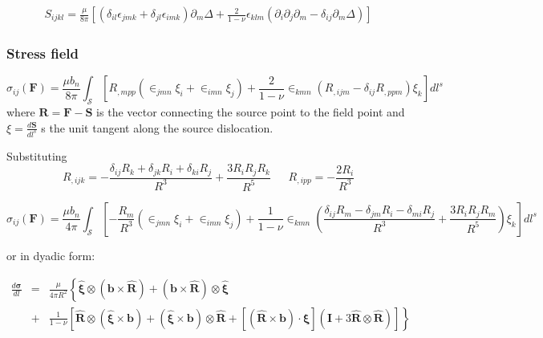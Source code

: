 \documentclass[10pt]{report}
\begin{document}
{\begin{align}
S_{ijkl}=\frac{\mu}{8\pi}\left[\left(\delta_{il}\epsilon_{jmk}+\delta_{jl}\epsilon_{imk}\right)\partial_m\Delta+\frac{2}{1-\nu}\epsilon_{klm}\left(\partial_{i}\partial_j\partial_m-\delta_{ij}\partial_m\Delta\right)\right]
\end{align}



\subsubsection{Stress field}
\begin{equation}
\sigma_{ij}(\bm F)=\frac{\mu b_n}{8\pi}\int_\mathcal{S} \left[R_{,mpp}\left(\in_{jmn}\xi_i+\in_{imn}\xi_j\right)+\frac{2}{1-\nu}\in_{kmn}\left(R_{,ijm}-\delta_{ij}R_{,ppm}\right)\xi_k\right]dl^s
\end{equation}
where $\bm R=\bm F-\bm S$ is the vector connecting the source point to the field point and $\xi=\frac{d\bm S}{dl^s}$ s the unit tangent along the source dislocation. 

Substituting 
\begin{equation}
R_{,ijk}=-\frac{\delta_{ij}R_k+\delta_{jk}R_i+\delta_{ki}R_j}{R^3}+\frac{3R_iR_jR_k}{R^5} \ \ \ \ \ \ \    R_{,ipp}=-\frac{2R_i}{R^3}
\end{equation}

\begin{equation}
\sigma_{ij}(\bm F)=\frac{\mu b_n}{4\pi}\int_\mathcal{S} \left[-\frac{R_m}{R^3}\left(\in_{jmn}\xi_i+\in_{imn}\xi_j\right)+\frac{1}{1-\nu}\in_{kmn}\left(\frac{\delta_{ij}R_m-\delta_{jm}R_i-\delta_{mi}R_j}{R^3}+\frac{3R_iR_jR_m}{R^5}\right)\xi_k\right]dl^s
\end{equation}




or in dyadic form:

\begin{eqnarray}
\frac{d\bm \sigma}{dl}&=&\frac{\mu}{4\pi R^2}\left\{\hat{\bm\xi}\otimes(\bm b\times \hat{\bm R})+(\bm b\times \hat{\bm R})\otimes\hat{\bm\xi}\right.\nonumber\\
&+&\left.\frac{1}{1-\nu}\left[\hat{\bm R}\otimes(\hat{\bm\xi}\times\bm b)+(\hat{\bm\xi}\times\bm b)\otimes\hat{\bm R}
+ \left[(\hat{\bm R}\times\bm b)\cdot\hat{\bm\xi}\right]\left(\bm I + 3\hat{\bm R}\otimes\hat{\bm R} \right)\right]\right\}
\end{eqnarray}

}
\end{document}
